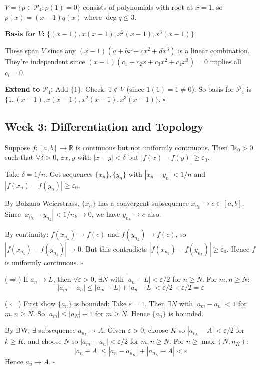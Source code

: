 \documentclass[11pt, letterpaper, openany]{book}
\newenvironment{solution}[1][Solution]{%
  \tcolorbox[blanker, breakable, left=1em,
    before skip=1em, after skip=1em,
    borderline west={2pt}{0pt}{MagicBlue},
    colback=MagicCream,
    before upper={\textcolor{MagicBlue}{\sffamily\bfseries #1.}\space}
  ]%
}{%
  \hfill\textcolor{MagicBlue}{\ensuremath{\square}}\endtcolorbox%
}
\begin{document}
\begin{solution}[2.7]
$V = \{p \in \mathcal{P}_4 : p(1) = 0\}$ consists of polynomials with root at $x = 1$, so $p(x) = (x-1)q(x)$ where $\deg q \leq 3$.

\textbf{Basis for $V$:} $\{(x-1), x(x-1), x^2(x-1), x^3(x-1)\}$.

These span $V$ since any $(x-1)(a + bx + cx^2 + dx^3)$ is a linear combination. They're independent since $(x-1)(c_1 + c_2 x + c_3 x^2 + c_4 x^3) = 0$ implies all $c_i = 0$.

\textbf{Extend to $\mathcal{P}_4$:} Add $\{1\}$. Check: $1 \notin V$ (since $1(1) = 1 \neq 0$). So basis for $\mathcal{P}_4$ is $\{1, (x-1), x(x-1), x^2(x-1), x^3(x-1)\}$.
\end{solution}

\subsection*{Week 3: Differentiation and Topology}

\begin{solution}[3.1]
Suppose $f: [a,b] \to \mathbb{R}$ is continuous but not uniformly continuous. Then $\exists \varepsilon_0 > 0$ such that $\forall \delta > 0$, $\exists x, y$ with $|x - y| < \delta$ but $|f(x) - f(y)| \geq \varepsilon_0$.

Take $\delta = 1/n$. Get sequences $\{x_n\}, \{y_n\}$ with $|x_n - y_n| < 1/n$ and $|f(x_n) - f(y_n)| \geq \varepsilon_0$.

By Bolzano-Weierstrass, $\{x_n\}$ has a convergent subsequence $x_{n_k} \to c \in [a,b]$. Since $|x_{n_k} - y_{n_k}| < 1/n_k \to 0$, we have $y_{n_k} \to c$ also.

By continuity: $f(x_{n_k}) \to f(c)$ and $f(y_{n_k}) \to f(c)$, so $|f(x_{n_k}) - f(y_{n_k})| \to 0$. But this contradicts $|f(x_{n_k}) - f(y_{n_k})| \geq \varepsilon_0$. Hence $f$ is uniformly continuous.
\end{solution}

\begin{solution}[3.3]
($\Rightarrow$) If $a_n \to L$, then $\forall \varepsilon > 0$, $\exists N$ with $|a_n - L| < \varepsilon/2$ for $n \geq N$. For $m, n \geq N$:
\[|a_m - a_n| \leq |a_m - L| + |a_n - L| < \varepsilon/2 + \varepsilon/2 = \varepsilon\]

($\Leftarrow$) First show $\{a_n\}$ is bounded: Take $\varepsilon = 1$. Then $\exists N$ with $|a_m - a_n| < 1$ for $m, n \geq N$. So $|a_m| \leq |a_N| + 1$ for $m \geq N$. Hence $\{a_n\}$ is bounded.

By BW, $\exists$ subsequence $a_{n_k} \to A$. Given $\varepsilon > 0$, choose $K$ so $|a_{n_k} - A| < \varepsilon/2$ for $k \geq K$, and choose $N$ so $|a_m - a_n| < \varepsilon/2$ for $m, n \geq N$. For $n \geq \max(N, n_K)$:
\[|a_n - A| \leq |a_n - a_{n_K}| + |a_{n_K} - A| < \varepsilon\]
Hence $a_n \to A$.
\end{solution}
\end{document}
